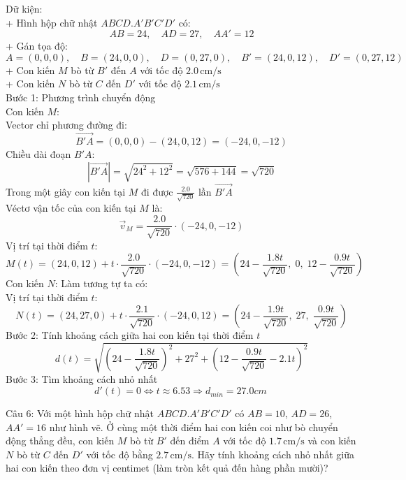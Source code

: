 \documentclass[a4paper,12pt]{article}
\begin{document}
Dữ kiện:\\
+ Hình hộp chữ nhật \(ABCD.A'B'C'D'\) có:\\
\[
AB = 24,\quad AD = 27,\quad AA' = 12
\]
+ Gán tọa độ:
\[
A = (0, 0, 0),\quad B = (24, 0, 0),\quad D = (0, 27, 0),\quad B' = (24, 0, 12),\quad D' = (0, 27, 12)
\]
+ Con kiến \(M\) bò từ \(B'\) đến \(A\) với tốc độ \(2.0\, \text{cm/s}\)\\
+ Con kiến \(N\) bò từ \(C\) đến \(D'\) với tốc độ \(2.1\, \text{cm/s}\)\\
Bước 1: Phương trình chuyển động\\
Con kiến \(M\):\\
Vector chỉ phương đường đi:
\[
\overrightarrow{B'A} = (0, 0, 0) - (24, 0, 12) = ( -24, 0, -12 )
\]
Chiều dài đoạn \(B'A\):
\[
|\overrightarrow{B'A}| = \sqrt{24^2 + 12^2} = \sqrt{576 + 144} = \sqrt{720}
\]
Trong một giây con kiến tại \(M\) đi được \(\frac{2.0}{\sqrt{720}}\) lần \(\overrightarrow{B'A}\)\\
Véctơ vận tốc của con kiến tại \(M\) là:
\[
\overrightarrow{v}_M = \frac{2.0}{\sqrt{720}} \cdot ( -24, 0, -12 )
\]
Vị trí tại thời điểm \(t\):
\[
M(t) = (24, 0, 12) + t \cdot \frac{2.0}{\sqrt{720}} \cdot ( -24, 0, -12 )
= \left( 24 - \frac{1.8t}{\sqrt{720}},\; 0,\; 12 - \frac{0.9t}{\sqrt{720}} \right)
\]
Con kiến \(N\): Làm tương tự ta có:\\
Vị trí tại thời điểm \(t\):
\[
N(t) = (24, 27, 0) + t \cdot \frac{2.1}{\sqrt{720}} \cdot (-24, 0, 12)
= \left( 24 - \frac{1.9t}{\sqrt{720}},\; 27,\; \frac{0.9t}{\sqrt{720}} \right)
\]
Bước 2: Tính khoảng cách giữa hai con kiến tại thời điểm \(t\)
\[
d(t) = \sqrt{\left(24 - \frac{1.8t}{\sqrt{720}}\right)^2 + 27^2 + \left(12 - \frac{0.9t}{\sqrt{720}} - 2.1t\right)^2}
\]
Bước 3: Tìm khoảng cách nhỏ nhất
\[
d'(t)=0\Leftrightarrow t \approx 6.53 \Rightarrow d_{min}=27.0cm\
\]




Câu 6: 
Với một hình hộp chữ nhật \(ABCD.A'B'C'D'\) có \(AB=10\), \(AD=26\), \(AA'=16\) như hình vẽ. Ở cùng một thời điểm hai con kiến coi như bò chuyển động thẳng đều, con kiến \(M\) bò từ \(B'\) đến điểm \(A\) với tốc độ \(1.7\,\mathrm{cm/s}\) và con kiến \(N\) bò từ \(C\) đến \(D'\) với tốc độ bằng \(2.7\,\mathrm{cm/s}\). Hãy tính khoảng cách nhỏ nhất giữa hai con kiến theo đơn vị centimet (làm tròn kết quả đến hàng phần mười)?
\end{document}
